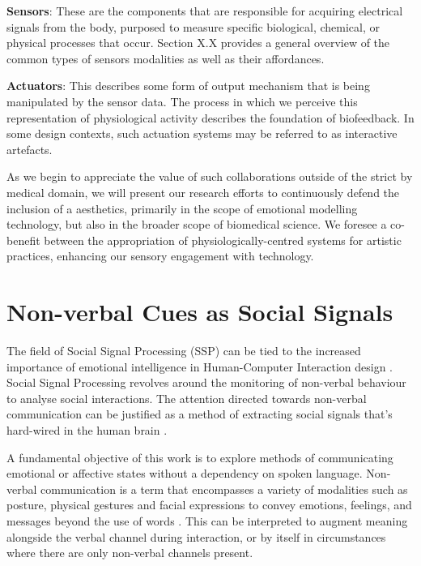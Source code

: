 \textbf{Sensors}: These are the components that are responsible for acquiring electrical signals from the body, purposed to measure specific biological, chemical, or physical processes that occur. Section X.X provides a general overview of the common types of sensors modalities as well as their affordances.

\textbf{Actuators}: This describes some form of output mechanism that is being manipulated by the sensor data. The process in which we perceive this representation of physiological activity describes the foundation of biofeedback. In some design contexts, such actuation systems may be referred to as interactive artefacts.

As we begin to appreciate the value of such collaborations outside of the strict by medical domain, we will present our research efforts to continuously defend the inclusion of a aesthetics, primarily in the scope of emotional modelling technology, but also in the broader scope of biomedical science. We foresee a co-benefit between the appropriation of physiologically-centred systems for artistic practices, enhancing our sensory engagement with technology. 

\section{Non-verbal Cues as Social Signals}

The field of Social Signal Processing (SSP) can be tied to the increased importance of emotional intelligence in Human-Computer Interaction design \cite{cristescu_emotions_2008}. Social Signal Processing revolves around the monitoring of non-verbal behaviour to analyse social interactions. The attention directed towards non-verbal communication can be justified as a method of extracting social signals that's hard-wired in the human brain \cite{vinciarelli_social_2009-1}.


A fundamental objective of this work is to explore methods of communicating emotional or affective states without a dependency on spoken language. Non-verbal communication is a term that encompasses a variety of modalities such as posture, physical gestures and facial expressions to convey emotions, feelings, and messages beyond the use of words \cite{knapp_nonverbal_2009, richmond_nonverbal_2011}. This can be interpreted to augment meaning alongside the verbal channel during interaction, or by itself in circumstances where there are only non-verbal channels present.

